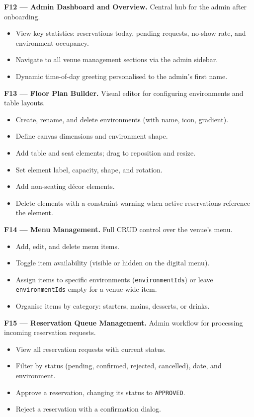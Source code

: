 \documentclass[12pt,a4paper,oneside]{report}
\begin{document}
\textbf{F12 --- Admin Dashboard and Overview.}
Central hub for the admin after onboarding.
\begin{itemize}[leftmargin=1.5em, topsep=2pt, itemsep=1pt]
  \item View key statistics: reservations today, pending requests, no-show
        rate, and environment occupancy.
  \item Navigate to all venue management sections via the admin sidebar.
  \item Dynamic time-of-day greeting personalised to the admin's first name.
\end{itemize}

\textbf{F13 --- Floor Plan Builder.}
Visual editor for configuring environments and table layouts.
\begin{itemize}[leftmargin=1.5em, topsep=2pt, itemsep=1pt]
  \item Create, rename, and delete environments (with name, icon, gradient).
  \item Define canvas dimensions and environment shape.
  \item Add table and seat elements; drag to reposition and resize.
  \item Set element label, capacity, shape, and rotation.
  \item Add non-seating décor elements.
  \item Delete elements with a constraint warning when active reservations
        reference the element.
\end{itemize}

\textbf{F14 --- Menu Management.}
Full CRUD control over the venue's menu.
\begin{itemize}[leftmargin=1.5em, topsep=2pt, itemsep=1pt]
  \item Add, edit, and delete menu items.
  \item Toggle item availability (visible or hidden on the digital menu).
  \item Assign items to specific environments (\texttt{environmentIds}) or
        leave \texttt{environmentIds} empty for a venue-wide item.
  \item Organise items by category: starters, mains, desserts, or drinks.
\end{itemize}

\textbf{F15 --- Reservation Queue Management.}
Admin workflow for processing incoming reservation requests.
\begin{itemize}[leftmargin=1.5em, topsep=2pt, itemsep=1pt]
  \item View all reservation requests with current status.
  \item Filter by status (pending, confirmed, rejected, cancelled), date,
        and environment.
  \item Approve a reservation, changing its status to \texttt{APPROVED}.
  \item Reject a reservation with a confirmation dialog.
\end{itemize}
\end{document}
